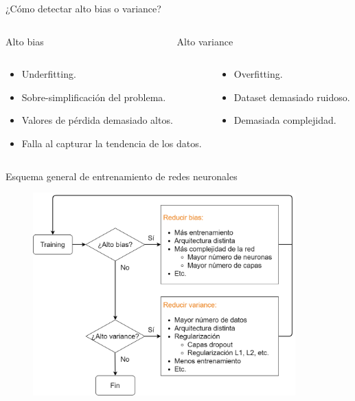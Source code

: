 \begin{frame}{¿Cómo detectar alto bias o variance?}

\begin{columns}[c]
\begin{column}{0.49\textwidth}
\Large \alert{Alto bias}
\end{column}

\begin{column}{0.49\textwidth}
\Large \alert{Alto variance}
\end{column}
\end{columns}

\begin{columns}[c]
\begin{column}{0.49\textwidth}
\begin{itemize}
    \item Underfitting.
    \item Sobre-simplificación del problema.
    \item Valores de pérdida demasiado altos.
    \item Falla al capturar la tendencia de los datos.
\end{itemize} 
\end{column}

\begin{column}{0.49\textwidth}
\begin{itemize}
    \item Overfitting.
    \item Dataset demasiado ruidoso.
    \item Demasiada complejidad.
\end{itemize} 
\end{column}
\end{columns}
\end{frame}

\begin{frame}{Esquema general de entrenamiento de redes neuronales}
\begin{figure}
\centering
    \includegraphics[width=0.9\textwidth]{figures/Tema 3/NNTrainingScheme.png}
\end{figure}
\end{frame}


